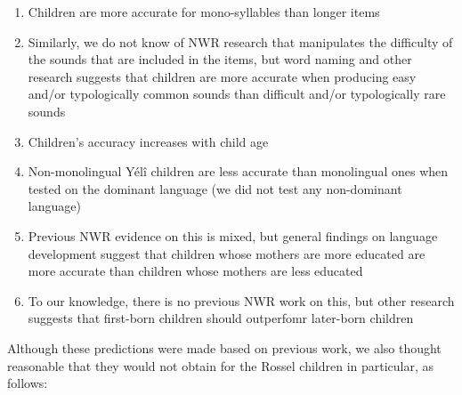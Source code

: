 \documentclass[english,,man,floatsintext]{apa6}
\providecommand{\tightlist}{%
  \setlength{\itemsep}{0pt}\setlength{\parskip}{0pt}}
\begin{document}
\begin{enumerate}
\def\labelenumi{\arabic{enumi}.}
\tightlist
\item
  Children are more accurate for mono-syllables than longer items
\item
  Similarly, we do not know of NWR research that manipulates the difficulty of the sounds that are included in the items, but word naming and other research suggests that children are more accurate when producing easy and/or typologically common sounds than difficult and/or typologically rare sounds
\item
  Children's accuracy increases with child age
\item
  Non-monolingual Yélî children are less accurate than monolingual ones when tested on the dominant language (we did not test any non-dominant language)
\item
  Previous NWR evidence on this is mixed, but general findings on language development suggest that children whose mothers are more educated are more accurate than children whose mothers are less educated
\item
  To our knowledge, there is no previous NWR work on this, but other research suggests that first-born children should outperfomr later-born children
\end{enumerate}

Although these predictions were made based on previous work, we also thought reasonable that they would not obtain for the Rossel children in particular, as follows:
\end{document}
